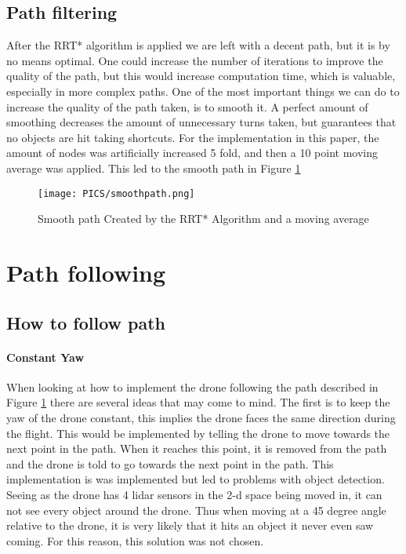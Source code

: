 \documentclass{article}
\begin{document}
\subsection{Path filtering}
After the RRT* algorithm is applied we are left with a decent path, but it is by no means optimal. One could increase the number of iterations to improve the quality of the path, but this would increase computation time, which is valuable, especially in more complex paths. One of the most important things we can do to increase the quality of the path taken, is to smooth it. A perfect amount of smoothing decreases the amount of unnecessary turns taken, but guarantees that no objects are hit taking shortcuts. For the implementation in this paper, the amount of nodes was artificially increased 5 fold, and then a 10 point moving average was applied. 
This led to the smooth path in Figure \ref{fig:smooth}

\begin{figure}[H]
\centering
\texttt{[image: PICS/smoothpath.png]}
\caption{\label{fig:smooth}Smooth path Created by the RRT* Algorithm and a moving average}
\end{figure}

\section{Path following}
\subsection{How to follow path}
\paragraph{Constant Yaw}
When looking at how to implement the drone following the path described in Figure \ref{fig:smooth} there are several ideas that may come to mind. The first is to keep the yaw of the drone constant, this implies the drone faces the same direction during the flight. This would be implemented by telling the drone to move towards the next point in the path. When it reaches this point, it is removed from the path and the drone is told to go towards the next point in the path. This implementation is was implemented but led to problems with object detection. Seeing as the drone has 4 lidar sensors in the 2-d space being moved in, it can not see every object around the drone. Thus when moving at a 45 degree angle relative to the drone, it is very likely that it hits an object it never even saw coming. For this reason, this solution was not chosen.
\end{document}
